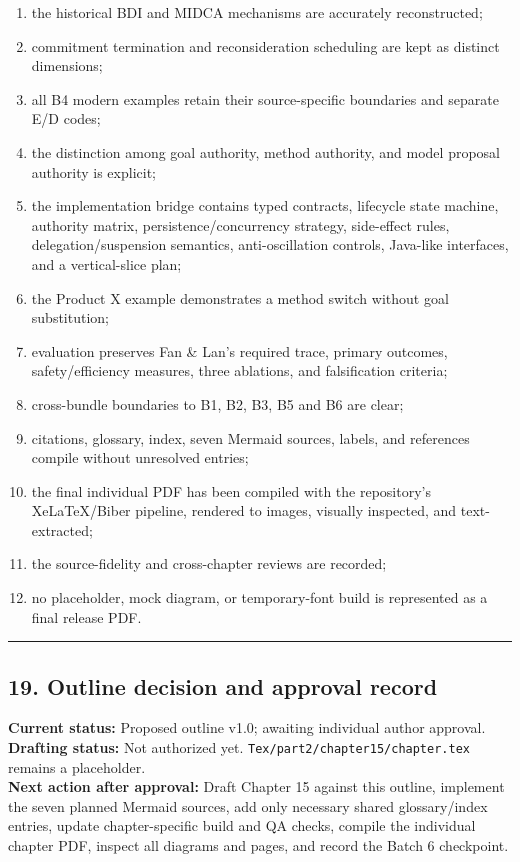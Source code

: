 \begin{enumerate}
\def\labelenumi{\arabic{enumi}.}
\tightlist
\item
  the historical BDI and MIDCA mechanisms are accurately reconstructed;
\item
  commitment termination and reconsideration scheduling are kept as distinct dimensions;
\item
  all B4 modern examples retain their source-specific boundaries and separate E/D codes;
\item
  the distinction among goal authority, method authority, and model proposal authority is explicit;
\item
  the implementation bridge contains typed contracts, lifecycle state machine, authority matrix, persistence/concurrency strategy, side-effect rules, delegation/suspension semantics, anti-oscillation controls, Java-like interfaces, and a vertical-slice plan;
\item
  the Product X example demonstrates a method switch without goal substitution;
\item
  evaluation preserves Fan \& Lan's required trace, primary outcomes, safety/efficiency measures, three ablations, and falsification criteria;
\item
  cross-bundle boundaries to B1, B2, B3, B5 and B6 are clear;
\item
  citations, glossary, index, seven Mermaid sources, labels, and references compile without unresolved entries;
\item
  the final individual PDF has been compiled with the repository's XeLaTeX/Biber pipeline, rendered to images, visually inspected, and text-extracted;
\item
  the source-fidelity and cross-chapter reviews are recorded;
\item
  no placeholder, mock diagram, or temporary-font build is represented as a final release PDF.
\end{enumerate}

\begin{center}\rule{0.5\linewidth}{0.5pt}\end{center}

\subsection{19. Outline decision and approval record}\label{outline-decision-and-approval-record}

\textbf{Current status:} Proposed outline v1.0; awaiting individual author approval.\\
\textbf{Drafting status:} Not authorized yet. \texttt{Tex/part2/chapter15/chapter.tex} remains a placeholder.\\
\textbf{Next action after approval:} Draft Chapter 15 against this outline, implement the seven planned Mermaid sources, add only necessary shared glossary/index entries, update chapter-specific build and QA checks, compile the individual chapter PDF, inspect all diagrams and pages, and record the Batch 6 checkpoint.

